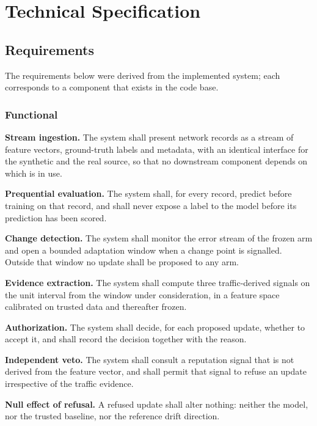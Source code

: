 \documentclass[12pt,a4paper]{report}
\begin{document}
\chapter{Technical Specification}

\section{Requirements}

The requirements below were derived from the implemented system; each
corresponds to a component that exists in the code base.

\subsection{Functional}

\textbf{Stream ingestion.} The system shall present network records as a stream
of feature vectors, ground-truth labels and metadata, with an identical interface
for the synthetic and the real source, so that no downstream component depends on
which is in use.

\textbf{Prequential evaluation.} The system shall, for every record, predict
before training on that record, and shall never expose a label to the model
before its prediction has been scored.

\textbf{Change detection.} The system shall monitor the error stream of the
frozen arm and open a bounded adaptation window when a change point is signalled.
Outside that window no update shall be proposed to any arm.

\textbf{Evidence extraction.} The system shall compute three traffic-derived
signals on the unit interval from the window under consideration, in a feature
space calibrated on trusted data and thereafter frozen.

\textbf{Authorization.} The system shall decide, for each proposed update,
whether to accept it, and shall record the decision together with the reason.

\textbf{Independent veto.} The system shall consult a reputation signal that is
not derived from the feature vector, and shall permit that signal to refuse an
update irrespective of the traffic evidence.

\textbf{Null effect of refusal.} A refused update shall alter nothing: neither
the model, nor the trusted baseline, nor the reference drift direction.
\end{document}
